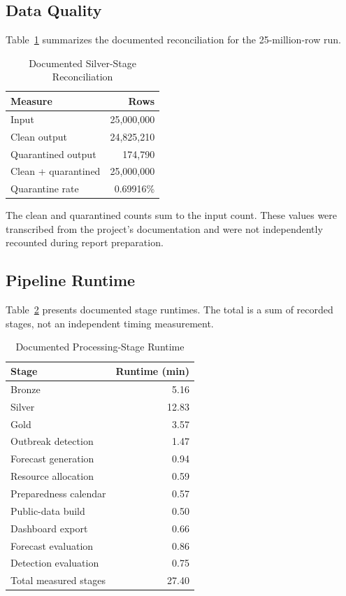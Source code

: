 \documentclass[conference]{IEEEtran}
\begin{document}
\subsection{Data Quality}

Table~\ref{tab:quality} summarizes the documented reconciliation for the 25-million-row run.

\begin{table}[htbp]
\caption{Documented Silver-Stage Reconciliation}
\label{tab:quality}
\centering
\begin{tabular}{lr}
\toprule
Measure & Rows \\
\midrule
Input & 25,000,000 \\
Clean output & 24,825,210 \\
Quarantined output & 174,790 \\
Clean + quarantined & 25,000,000 \\
Quarantine rate & 0.69916\% \\
\bottomrule
\end{tabular}
\end{table}

The clean and quarantined counts sum to the input count. These values were transcribed from the project's documentation and were not independently recounted during report preparation.

\subsection{Pipeline Runtime}

Table~\ref{tab:runtime} presents documented stage runtimes. The total is a sum of recorded stages, not an independent timing measurement.

\begin{table}[htbp]
\caption{Documented Processing-Stage Runtime}
\label{tab:runtime}
\centering
\begin{tabular}{lr}
\toprule
Stage & Runtime (min) \\
\midrule
Bronze & 5.16 \\
Silver & 12.83 \\
Gold & 3.57 \\
Outbreak detection & 1.47 \\
Forecast generation & 0.94 \\
Resource allocation & 0.59 \\
Preparedness calendar & 0.57 \\
Public-data build & 0.50 \\
Dashboard export & 0.66 \\
Forecast evaluation & 0.86 \\
Detection evaluation & 0.75 \\
\midrule
Total measured stages & 27.40 \\
\bottomrule
\end{tabular}
\end{table}
\end{document}
